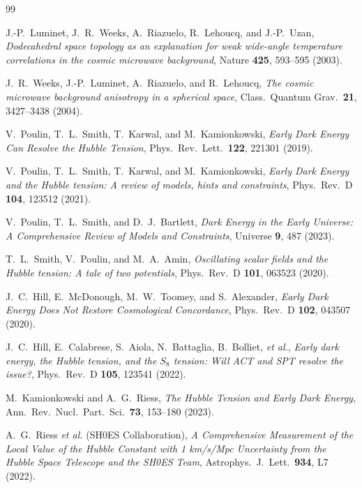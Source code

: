 \documentclass[11pt,a4paper]{article}
\theoremstyle{definition}
\begin{document}
\begin{thebibliography}{99}

J.-P.~Luminet, J.~R.~Weeks, A.~Riazuelo, R.~Lehoucq, and J.-P.~Uzan,
\textit{Dodecahedral space topology as an explanation for weak wide-angle temperature correlations in the cosmic microwave background},
Nature \textbf{425}, 593--595 (2003).

J.~R.~Weeks, J.-P.~Luminet, A.~Riazuelo, and R.~Lehoucq,
\textit{The cosmic microwave background anisotropy in a spherical space},
Class.\ Quantum Grav.\ \textbf{21}, 3427--3438 (2004).

V.~Poulin, T.~L.~Smith, T.~Karwal, and M.~Kamionkowski,
\textit{Early Dark Energy Can Resolve the Hubble Tension},
Phys.\ Rev.\ Lett.\ \textbf{122}, 221301 (2019).

V.~Poulin, T.~L.~Smith, T.~Karwal, and M.~Kamionkowski,
\textit{Early Dark Energy and the Hubble tension: A review of models, hints and constraints},
Phys.\ Rev.\ D \textbf{104}, 123512 (2021).

V.~Poulin, T.~L.~Smith, and D.~J.~Bartlett,
\textit{Dark Energy in the Early Universe: A Comprehensive Review of Models and Constraints},
Universe \textbf{9}, 487 (2023).

T.~L.~Smith, V.~Poulin, and M.~A.~Amin,
\textit{Oscillating scalar fields and the Hubble tension: A tale of two potentials},
Phys.\ Rev.\ D \textbf{101}, 063523 (2020).

J.~C.~Hill, E.~McDonough, M.~W.~Toomey, and S.~Alexander,
\textit{Early Dark Energy Does Not Restore Cosmological Concordance},
Phys.\ Rev.\ D \textbf{102}, 043507 (2020).

J.~C.~Hill, E.~Calabrese, S.~Aiola, N.~Battaglia, B.~Bolliet, \textit{et al.},
\textit{Early dark energy, the Hubble tension, and the $S_8$ tension: Will ACT and SPT resolve the issue?},
Phys.\ Rev.\ D \textbf{105}, 123541 (2022).

M.~Kamionkowski and A.~G.~Riess,
\textit{The Hubble Tension and Early Dark Energy},
Ann.\ Rev.\ Nucl.\ Part.\ Sci.\ \textbf{73}, 153--180 (2023).

A.~G.~Riess \textit{et al.} (SH0ES Collaboration),
\textit{A Comprehensive Measurement of the Local Value of the Hubble Constant with 1 km/s/Mpc Uncertainty from the Hubble Space Telescope and the SH0ES Team},
Astrophys.\ J.\ Lett.\ \textbf{934}, L7 (2022).


\end{thebibliography}
\end{document}
